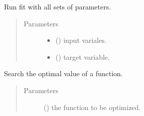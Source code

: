 \documentclass[letterpaper,10pt,english]{sphinxmanual}
\begin{document}
\begin{fulllineitems}
\begin{fulllineitems}
\label{\detokenize{apidoc:pysequd.seqrand.SeqRand.fit}}
Run fit with all sets of parameters.
\begin{quote}\begin{description}
\item[{Parameters}] \leavevmode\begin{itemize}
\item {} 
 (\sphinxstyleliteralemphasis{\sphinxupquote{, }}\sphinxstyleliteralemphasis{\sphinxupquote{ {[}}}\sphinxstyleliteralemphasis{\sphinxupquote{, }}\sphinxstyleliteralemphasis{\sphinxupquote{{]}}}) \textendash{} input variales.

\item {} 
 (\sphinxstyleliteralemphasis{\sphinxupquote{, }}\sphinxstyleliteralemphasis{\sphinxupquote{ {[}}}\sphinxstyleliteralemphasis{\sphinxupquote{{]} or }}\sphinxstyleliteralemphasis{\sphinxupquote{{[}}}\sphinxstyleliteralemphasis{\sphinxupquote{, }}\sphinxstyleliteralemphasis{\sphinxupquote{{]}}}\sphinxstyleliteralemphasis{\sphinxupquote{, }}) \textendash{} target variable.

\end{itemize}

\end{description}\end{quote}

\end{fulllineitems}


\begin{fulllineitems}
\label{\detokenize{apidoc:pysequd.seqrand.SeqRand.fmin}}
Search the optimal value of a function.
\begin{quote}\begin{description}
\item[{Parameters}] \leavevmode
{} () \textendash{} the function to be optimized.


\end{description}
\end{quote}
\end{fulllineitems}
\end{fulllineitems}
\end{document}
